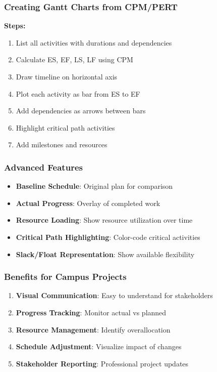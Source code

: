 \documentclass[
  letterpaper,
  DIV=11,
  numbers=noendperiod]{scrreprt}
\providecommand{\tightlist}{%
  \setlength{\itemsep}{0pt}\setlength{\parskip}{0pt}}
\begin{document}
\subsubsection{Creating Gantt Charts from
CPM/PERT}\label{creating-gantt-charts-from-cpmpert}

\textbf{Steps:}

\begin{enumerate}
\def\labelenumi{\arabic{enumi}.}
\tightlist
\item
  List all activities with durations and dependencies
\item
  Calculate ES, EF, LS, LF using CPM
\item
  Draw timeline on horizontal axis
\item
  Plot each activity as bar from ES to EF
\item
  Add dependencies as arrows between bars
\item
  Highlight critical path activities
\item
  Add milestones and resources
\end{enumerate}

\subsubsection{Advanced Features}\label{advanced-features}

\begin{itemize}
\tightlist
\item
  \textbf{Baseline Schedule}: Original plan for comparison
\item
  \textbf{Actual Progress}: Overlay of completed work
\item
  \textbf{Resource Loading}: Show resource utilization over time
\item
  \textbf{Critical Path Highlighting}: Color-code critical activities
\item
  \textbf{Slack/Float Representation}: Show available flexibility
\end{itemize}

\subsubsection{Benefits for Campus
Projects}\label{benefits-for-campus-projects}

\begin{enumerate}
\def\labelenumi{\arabic{enumi}.}
\tightlist
\item
  \textbf{Visual Communication}: Easy to understand for stakeholders
\item
  \textbf{Progress Tracking}: Monitor actual vs planned
\item
  \textbf{Resource Management}: Identify overallocation
\item
  \textbf{Schedule Adjustment}: Visualize impact of changes
\item
  \textbf{Stakeholder Reporting}: Professional project updates
\end{enumerate}
\end{document}
